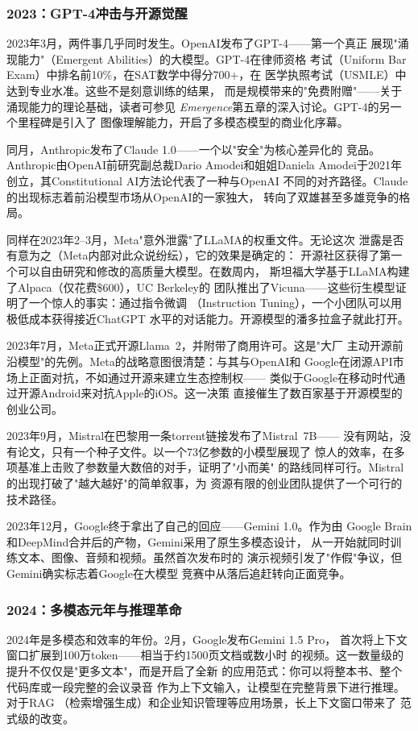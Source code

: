 \subsubsection{2023：GPT-4冲击与开源觉醒}
2023年3月，两件事几乎同时发生。OpenAI发布了GPT-4——第一个真正
展现"涌现能力"（Emergent Abilities）的大模型。GPT-4在律师资格
考试（Uniform Bar Exam）中排名前10\%，在SAT数学中得分700+，在
医学执照考试（USMLE）中达到专业水准。这些不是刻意训练的结果，
而是规模带来的"免费附赠"——关于涌现能力的理论基础，读者可参见
\textit{Emergence}第五章的深入讨论。GPT-4的另一个里程碑是引入了
图像理解能力，开启了多模态模型的商业化序幕。

同月，Anthropic发布了Claude 1.0——一个以"安全"为核心差异化的
竞品。Anthropic由OpenAI前研究副总裁Dario Amodei和姐姐Daniela
Amodei于2021年创立，其Constitutional AI方法论代表了一种与OpenAI
不同的对齐路径。Claude的出现标志着前沿模型市场从OpenAI的一家独大，
转向了双雄甚至多雄竞争的格局。

同样在2023年2--3月，Meta"意外泄露"了LLaMA的权重文件。无论这次
泄露是否有意为之（Meta内部对此众说纷纭），它的效果是确定的：
开源社区获得了第一个可以自由研究和修改的高质量大模型。在数周内，
斯坦福大学基于LLaMA构建了Alpaca（仅花费\$600），UC Berkeley的
团队推出了Vicuna——这些衍生模型证明了一个惊人的事实：通过指令微调
（Instruction Tuning），一个小团队可以用极低成本获得接近ChatGPT
水平的对话能力。开源模型的潘多拉盒子就此打开。

2023年7月，Meta正式开源Llama~2，并附带了商用许可。这是"大厂
主动开源前沿模型"的先例。Meta的战略意图很清楚：与其与OpenAI和
Google在闭源API市场上正面对抗，不如通过开源来建立生态控制权——
类似于Google在移动时代通过开源Android来对抗Apple的iOS。这一决策
直接催生了数百家基于开源模型的创业公司。

2023年9月，Mistral在巴黎用一条torrent链接发布了Mistral~7B——
没有网站，没有论文，只有一个种子文件。以一个73亿参数的小模型展现了
惊人的效率，在多项基准上击败了参数量大数倍的对手，证明了"小而美"
的路线同样可行。Mistral的出现打破了"越大越好"的简单叙事，为
资源有限的创业团队提供了一个可行的技术路径。

2023年12月，Google终于拿出了自己的回应——Gemini 1.0。作为由
Google Brain和DeepMind合并后的产物，Gemini采用了原生多模态设计，
从一开始就同时训练文本、图像、音频和视频。虽然首次发布时的
演示视频引发了"作假"争议，但Gemini确实标志着Google在大模型
竞赛中从落后追赶转向正面竞争。

\subsubsection{2024：多模态元年与推理革命}
2024年是多模态和效率的年份。2月，Google发布Gemini 1.5 Pro，
首次将上下文窗口扩展到100万token——相当于约1500页文档或数小时
的视频。这一数量级的提升不仅仅是"更多文本"，而是开启了全新
的应用范式：你可以将整本书、整个代码库或一段完整的会议录音
作为上下文输入，让模型在完整背景下进行推理。对于RAG
（检索增强生成）和企业知识管理等应用场景，长上下文窗口带来了
范式级的改变。

